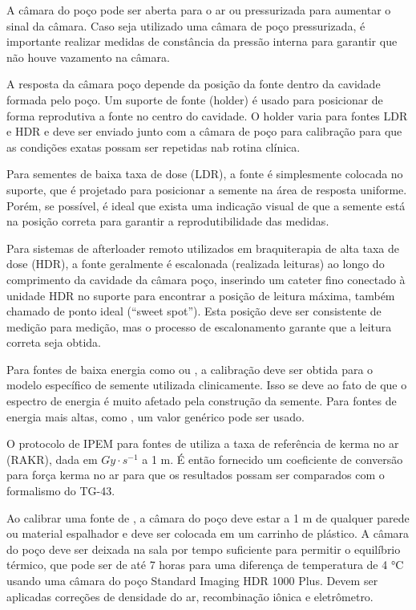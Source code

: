\documentclass[11pt,a4paper]{article}
\begin{document}
	A câmara do poço pode ser aberta para o ar ou pressurizada para aumentar o sinal da câmara. Caso seja utilizado uma câmara de poço pressurizada, é importante realizar medidas de constância da pressão interna para garantir que não houve vazamento na câmara. 
	
	A resposta da câmara poço depende da posição da fonte dentro da cavidade formada pelo poço. Um suporte de fonte (holder) é usado para posicionar de forma reprodutiva a fonte no centro do cavidade. O holder varia para fontes LDR e HDR 
	e deve ser enviado junto com a câmara de poço para calibração para que as condições exatas possam ser repetidas nab rotina clínica.
	
	Para sementes de baixa taxa de dose (LDR), a fonte é simplesmente colocada no suporte, que é projetado para posicionar a semente na área de resposta uniforme. Porém, se possível, é ideal que exista uma indicação visual de que a semente está na posição correta para garantir a  reprodutibilidade das medidas.

	Para sistemas de afterloader remoto utilizados em braquiterapia de alta taxa de dose (HDR), a fonte geralmente é escalonada (realizada leituras) ao longo do comprimento da cavidade da câmara poço, inserindo um cateter fino conectado à unidade HDR no suporte para encontrar a posição de leitura máxima, também chamado de ponto ideal (``sweet spot''). Esta posição deve ser consistente de medição para medição, mas o processo de escalonamento garante que a leitura correta seja obtida.

	Para fontes de baixa energia como  ou , a calibração deve ser obtida para o modelo específico de semente utilizada clinicamente. Isso se deve ao fato de que o espectro de energia é muito afetado pela construção da semente. Para fontes de energia mais altas, como , um valor genérico pode ser usado.

	O protocolo de IPEM para fontes de  utiliza a taxa de referência de kerma no ar (RAKR), dada em $Gy \cdot s^{-1}$ a 1 m. É então fornecido um coeficiente de conversão para força  kerma no ar para que os resultados possam ser comparados com o formalismo do TG-43.

	Ao calibrar uma fonte de , a câmara do poço deve estar a 1 m de qualquer parede ou material espalhador e deve ser colocada em um carrinho de plástico. A câmara do poço deve ser deixada na sala por tempo suficiente para permitir o equilíbrio térmico, que pode ser de até 7 horas para uma diferença de temperatura de 4 °C usando uma câmara do poço Standard Imaging HDR 1000 Plus. Devem ser aplicadas correções de densidade do ar, recombinação iônica e eletrômetro. 
\end{document}
